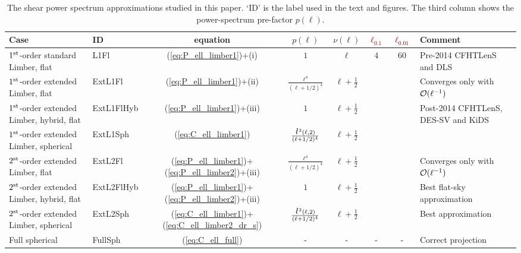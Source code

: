 \documentclass[fleqn,usenatbib]{mnras} %
\newcommand{\ellbar}{\hbox{\it \l}\,}
\newcommand{\forref}[1]{{\bf\textcolor{darkred}{#1}}}
\begin{document}
\renewcommand{\baselinestretch}{1.5}
\begin{table}
\begin{centering}
  \caption{\label{tab:cases}The shear power spectrum approximations studied in this paper. `ID' is the label
    used in the text and figures.
    The third column shows the power-spectrum pre-factor $p(\ell)$. } 
    \begin{tabular}{|p{}|l|c|c|c|c|c|p{}}
  \hline
  Case & ID & equation & $p(\ell)$ & $\nu(\ell)$ & \forref{$\ell_{0.1}$} & \forref{$\ell_{0.01}$} & Comment \\ \hline
  $1^{\rm st}$-order standard Limber, flat & L1Fl & (\ref{eq:P_ell_limber1})+(i)
    & $1$ & $\ell$ & $4$ & $60$ & Pre-2014 CFHTLenS and DLS \\ \hline
  $1^{\rm st}$-order extended Limber, flat & ExtL1Fl & (\ref{eq:P_ell_limber1})+(ii)
    & $\frac{\ell^4}{(\ell+1/2)^4}$ & $\ell + \frac 1 2$ & & & Converges only with ${\cal O}(\ell^{-1})$ \\ \hline
  $1^{\rm st}$-order extended Limber, hybrid, flat & ExtL1FlHyb & (\ref{eq:P_ell_limber1})+(iii)
    & $1$ & $\ell + \frac 1 2$ & & & Post-2014 CFHTLenS, DES-SV and KiDS \\ \hline
  $1^{\rm st}$-order extended Limber, spherical & ExtL1Sph & (\ref{eq:C_ell_limber1})
    & $\frac{\ellbar^2(\ell, 2)}{(\ell+1/2)^4}$ & $\ell+ \frac 1 2$ & & & \\ \hline
  $2^{\rm st}$-order extended Limber, flat & ExtL2Fl &  (\ref{eq:P_ell_limber1})+(\ref{eq:P_ell_limber2})+(iii)
    & $\frac{\ell^4}{(\ell+1/2)^4}$ 
    & $\ell+\frac 1 2$ & & & Converges only with ${\cal O}(\ell^{-1})$ \\ \hline
  $2^{\rm st}$-order extended Limber, hybrid, flat & ExtL2FlHyb &  (\ref{eq:P_ell_limber1})+(\ref{eq:P_ell_limber2})+(iii)
    & $1$ 
    & $\ell+ \frac 1 2$ & & & Best flat-sky approximation \\ \hline
  $2^{\rm st}$-order extended Limber, spherical & ExtL2Sph & (\ref{eq:C_ell_limber1})+(\ref{eq:C_ell_limber2_dr_s})
    & $\frac{\ellbar^2(\ell, 2)}{(\ell+1/2)^4}$ & $\ell+\frac 1 2$ & & & Best approximation \\ \hline
  Full spherical & FullSph & (\ref{eq:C_ell_full}) &
      - & - & - & - & Correct projection \\ \hline
  \end{tabular}

\end{centering}
\end{table}
\renewcommand{\baselinestretch}{1}
\end{document}
